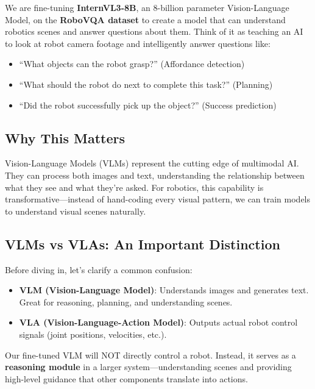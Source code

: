 \documentclass[11pt,a4paper]{article}
\begin{document}
We are fine-tuning \textbf{InternVL3-8B}, an 8-billion parameter Vision-Language Model, on the \textbf{RoboVQA dataset} to create a model that can understand robotics scenes and answer questions about them. Think of it as teaching an AI to look at robot camera footage and intelligently answer questions like:

\begin{itemize}
    \item ``What objects can the robot grasp?'' (Affordance detection)
    \item ``What should the robot do next to complete this task?'' (Planning)
    \item ``Did the robot successfully pick up the object?'' (Success prediction)
\end{itemize}

\subsection{Why This Matters}

Vision-Language Models (VLMs) represent the cutting edge of multimodal AI. They can process both images and text, understanding the relationship between what they see and what they're asked. For robotics, this capability is transformative---instead of hand-coding every visual pattern, we can train models to understand visual scenes naturally.

\subsection{VLMs vs VLAs: An Important Distinction}

\begin{keyinsight}
Before diving in, let's clarify a common confusion:
\begin{itemize}
    \item \textbf{VLM (Vision-Language Model)}: Understands images and generates text. Great for reasoning, planning, and understanding scenes.
    \item \textbf{VLA (Vision-Language-Action Model)}: Outputs actual robot control signals (joint positions, velocities, etc.).
\end{itemize}
Our fine-tuned VLM will NOT directly control a robot. Instead, it serves as a \textbf{reasoning module} in a larger system---understanding scenes and providing high-level guidance that other components translate into actions.
\end{keyinsight}
\end{document}
